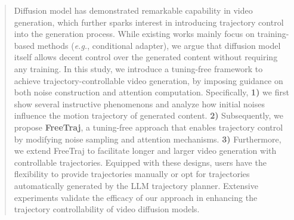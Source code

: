 \begin{abstract}

Diffusion model has demonstrated remarkable capability in video generation, which further sparks interest in introducing trajectory control into the generation process. While existing works mainly focus on training-based methods (\textit{e.g.}, conditional adapter), we argue that diffusion model itself allows decent control over the generated content without requiring any training.
%
In this study, we introduce a tuning-free framework to achieve trajectory-controllable video generation, by imposing guidance on both noise construction and attention computation. Specifically, \textbf{1)} we first show several instructive phenomenons and analyze how initial noises influence the motion trajectory of generated content. \textbf{2)} Subsequently, we propose \textbf{FreeTraj}, a tuning-free approach that enables trajectory control by modifying noise sampling and attention mechanisms. \textbf{3)} Furthermore, we extend FreeTraj to facilitate longer and larger video generation with controllable trajectories. Equipped with these designs, users have the flexibility to provide trajectories manually or opt for trajectories automatically generated by the LLM trajectory planner. Extensive experiments validate the efficacy of our approach in enhancing the trajectory controllability of video diffusion models.
%

\end{abstract}